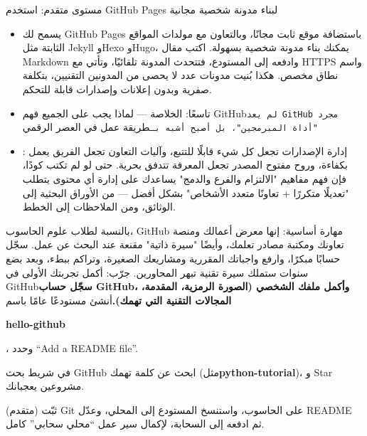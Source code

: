 \begin{tcbwarn}{مستوى متقدم: استخدم GitHub Pages لبناء مدونة شخصية مجانية}
\begin{itemize}
  \item يسمح لك GitHub Pages باستضافة موقع ثابت مجانًا، وبالتعاون مع مولدات المواقع الثابتة مثل Jekyll وHexo وHugo، يمكنك بناء مدونة شخصية بسهولة. اكتب مقال Markdown وادفعه إلى المستودع، فتتحدث المدونة تلقائيًا، وتأتي مع HTTPS واسم نطاق مخصص. هكذا بُنيت مدونات عدد لا يحصى من المدونين التقنيين، بتكلفة صفرية وبدون إعلانات وإصدارات قابلة للتحكم.
  \item تاسعًا: الخلاصة — لماذا يجب على الجميع فهم GitHub\texttt{لم يعد GitHub مجرد "أداة المبرمجين"، بل أصبح أشبه بـ}طريقة عمل في العصر الرقمي
  \item : إدارة الإصدارات تجعل كل شيء قابلًا للتتبع، وآليات التعاون تجعل الفريق يعمل بكفاءة، وروح مفتوح المصدر تجعل المعرفة تتدفق بحرية. حتى لو لم تكتب كودًا، فإن فهم مفاهيم "الالتزام والفرع والدمج" يساعدك على إدارة أي محتوى يتطلب "تعديلًا متكررًا + تعاونًا متعدد الأشخاص" بشكل أفضل — من الأوراق البحثية إلى الوثائق، ومن الملاحظات إلى الخطط.
\end{itemize}

\end{tcbwarn}

\begin{tcbinfo}{بالنسبة لطلاب علوم الحاسوب، GitHub مهارة أساسية: إنها معرض أعمالك ومنصة تعاونك ومكتبة مصادر تعلمك، وأيضًا "سيرة ذاتية" مقنعة عند البحث عن عمل. سجّل حسابًا مبكرًا، وارفع واجباتك المقررية ومشاريعك الصغيرة، وتراكم ببطء، وبعد بضع سنوات ستملك سيرة تقنية تبهر المحاورين.}
جرّب: أكمل تجربتك الأولى في GitHub\textbf{سجّل حساب GitHub، وأكمل ملفك الشخصي (الصورة الرمزية، المقدمة، المجالات التقنية التي تهمك).}أنشئ مستودعًا عامًا باسم

\end{tcbinfo}

\textbf{hello-github}\par

، وحدد “Add a README file”.


في شريط بحث GitHub ابحث عن كلمة تهمك (مثل\textbf{python-tutorial})، و Star مشروعين يعجبانك.

(متقدم) ثبّت Git على الحاسوب، واستنسخ المستودع إلى المحلي، وعدّل README ثم ادفعه إلى السحابة، لإكمال سير عمل “محلي سحابي” كامل.


